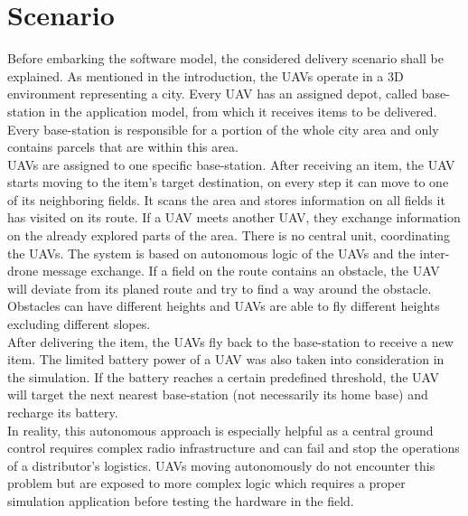 \section{Scenario}\label{sec:scenario}
Before embarking the software model, the considered delivery scenario shall be explained. As mentioned in the introduction, the UAVs operate in a 3D environment representing a city. Every UAV has an assigned depot, called base-station in the application model, from which it receives items to be delivered. Every base-station is responsible for a portion of the whole city area and only contains parcels that are within this area. \\
 UAVs are assigned to one specific base-station. After receiving an item, the UAV starts moving to the item’s target destination, on every step it can move to one of its neighboring fields. It scans the area and stores information on all fields it has visited on its route. If a UAV meets another UAV, they exchange information on the already explored parts of the area. There is no central unit, coordinating the UAVs. The system is based on autonomous logic of the UAVs and the inter-drone message exchange. If a field on the route contains an obstacle, the UAV will deviate from its planed route and try to find a way around the obstacle. Obstacles can have different heights and UAVs are able to fly different heights excluding different slopes. \\
After delivering the item, the UAVs fly back to the base-station to receive a new item. The limited battery power of a UAV was also taken into consideration in the simulation. If the battery reaches a certain predefined threshold, the UAV will target the next nearest base-station (not necessarily its home base) and recharge its battery.\\
In reality, this autonomous approach is especially helpful as a central ground control requires complex radio infrastructure and can fail and stop the operations of a distributor's logistics.  UAVs moving autonomously do not encounter this problem but are exposed to more complex logic which requires a proper simulation application before testing the hardware in the field.

